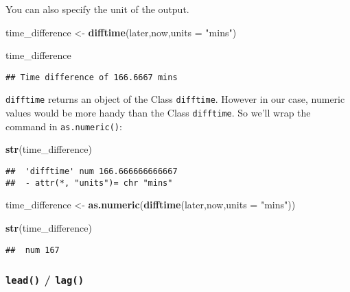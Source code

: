 \documentclass[
]{article}
\newenvironment{Shaded}{\begin{snugshade}}{\end{snugshade}}
\newcommand{\DataTypeTok}[1]{\textcolor[rgb]{0.13,0.29,0.53}{#1}}
\newcommand{\KeywordTok}[1]{\textcolor[rgb]{0.13,0.29,0.53}{\textbf{#1}}}
\newcommand{\NormalTok}[1]{#1}
\newcommand{\StringTok}[1]{\textcolor[rgb]{0.31,0.60,0.02}{#1}}
\begin{document}
You can also specify the unit of the output.

\begin{Shaded}
\begin{Highlighting}[]
\NormalTok{time_difference <-}\StringTok{ }\KeywordTok{difftime}\NormalTok{(later,now,}\DataTypeTok{units =} \StringTok{"mins"}\NormalTok{)}
\end{Highlighting}
\end{Shaded}

\begin{Shaded}
\begin{Highlighting}[]
\NormalTok{time_difference}
\end{Highlighting}
\end{Shaded}

\begin{verbatim}
## Time difference of 166.6667 mins
\end{verbatim}

\texttt{difftime} returns an object of the Class \texttt{difftime}.
However in our case, numeric values would be more handy than the Class
\texttt{difftime}. So we'll wrap the command in \texttt{as.numeric()}:

\begin{Shaded}
\begin{Highlighting}[]
\KeywordTok{str}\NormalTok{(time_difference)}
\end{Highlighting}
\end{Shaded}

\begin{verbatim}
##  'difftime' num 166.666666666667
##  - attr(*, "units")= chr "mins"
\end{verbatim}

\begin{Shaded}
\begin{Highlighting}[]
\NormalTok{time_difference <-}\StringTok{ }\KeywordTok{as.numeric}\NormalTok{(}\KeywordTok{difftime}\NormalTok{(later,now,}\DataTypeTok{units =} \StringTok{"mins"}\NormalTok{))}

\KeywordTok{str}\NormalTok{(time_difference)}
\end{Highlighting}
\end{Shaded}

\begin{verbatim}
##  num 167
\end{verbatim}

\hypertarget{lead-lag}{%
\subsubsection{\texorpdfstring{\texttt{lead()} /
\texttt{lag()}}{lead() / lag()}}\label{lead-lag}}
\end{document}
